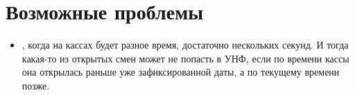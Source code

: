 \section{Возможные проблемы}

\begin{itemize}	
	\item  {}, когда на кассах будет разное время, достаточно нескольких секунд. И тогда какая-то из открытых смен может не попасть в УНФ, если по времени кассы она открылась раньше уже зафиксированной даты, а по текущему времени позже.

\end{itemize}

